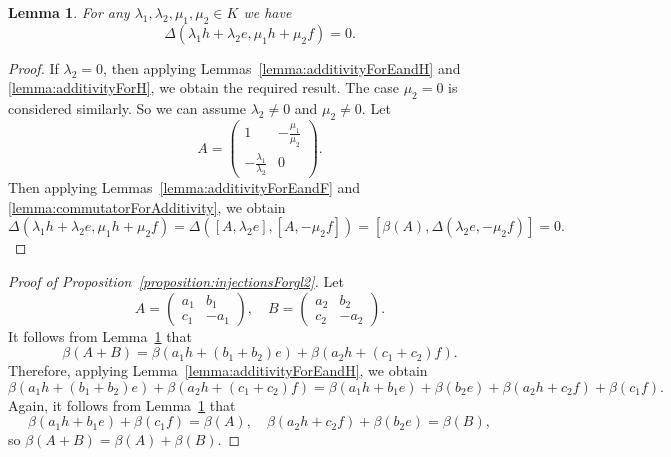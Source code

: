 \documentclass[a4paper,reqno,12pt]{amsart}
\newtheorem{lemma}[proposition]{Lemma}
\theoremstyle{definition}
\theoremstyle{remark}
\begin{document}
	\begin{lemma}\label{lemma:additivityForTriangular}
		For any $\lambda_1, \lambda_2, \mu_1, \mu_2 \in K$ we have
		\begin{equation*}
			\Delta(\lambda_1 h + \lambda_2 e, \mu_1 h + \mu_2 f) = 0.
		\end{equation*}
	\end{lemma}

	\begin{proof}
		If $\lambda_2 = 0$, then applying Lemmas~\ref{lemma:additivityForEandH} and \ref{lemma:additivityForH}, we obtain the required result. The case $\mu_2 = 0$ is considered similarly. So we can assume $\lambda_2 \neq 0$ and $\mu_2 \neq 0$. Let
		\begin{equation*}
			A = 
			\begin{pmatrix}
				1 & -\frac{\mu_1}{\mu_2} \\
				-\frac{\lambda_1}{\lambda_2} & 0
			\end{pmatrix}.
		\end{equation*}
		Then applying Lemmas~\ref{lemma:additivityForEandF} and \ref{lemma:commutatorForAdditivity}, we obtain
		\begin{equation*}
			\Delta(\lambda_1 h + \lambda_2 e, \mu_1 h + \mu_2 f) = \Delta([A, \lambda_2 e], [A, -\mu_2 f]) = [\beta(A), \Delta(\lambda_2 e, -\mu_2 f)] = 0.
		\end{equation*}
	\end{proof}

	\begin{proof}[Proof of Proposition~\ref{proposition:injectionsForgl2}]
		Let
		\begin{equation*}
			A = 
			\begin{pmatrix}
				a_1 & b_1 \\
				c_1 & -a_1
			\end{pmatrix}, \quad
			B =
			\begin{pmatrix}
				a_2 & b_2 \\
				c_2 & -a_2
			\end{pmatrix}.
		\end{equation*}
		It follows from Lemma~\ref{lemma:additivityForTriangular} that
		\begin{equation*}
			\beta(A + B) = \beta(a_1 h + (b_1 + b_2)e) + \beta(a_2 h + (c_1 + c_2)f).
		\end{equation*}
		Therefore, applying Lemma~\ref{lemma:additivityForEandH}, we obtain
		\begin{equation*}
			\beta(a_1 h + (b_1 + b_2)e) + \beta(a_2 h + (c_1 + c_2)f) = \beta(a_1 h + b_1 e) + \beta(b_2 e) + \beta(a_2 h + c_2 f) + \beta(c_1 f).
		\end{equation*}
		Again, it follows from Lemma~\ref{lemma:additivityForTriangular} that 
		\begin{equation*}
			\beta(a_1 h + b_1 e) + \beta(c_1 f) = \beta(A), \quad \beta(a_2 h + c_2 f) + \beta(b_2 e) = \beta(B),
		\end{equation*}
		so $\beta(A + B) = \beta(A) + \beta(B)$.
	\end{proof}
\end{document}
